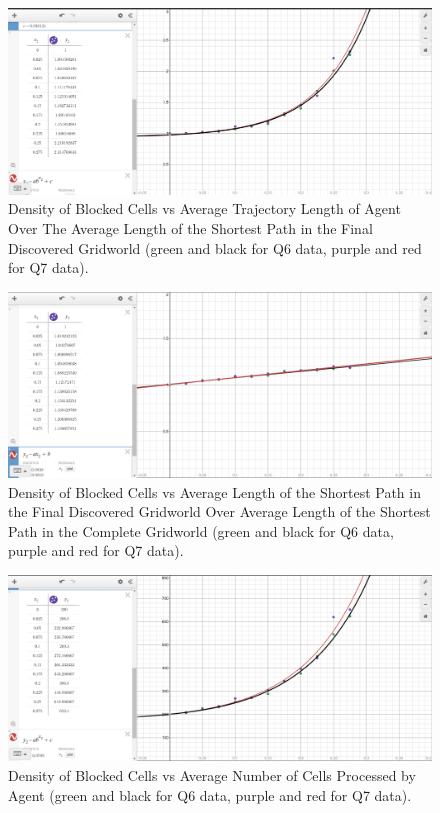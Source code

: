 \documentclass{homeworg}
\begin{document}
\begin{figure}[h]
  	\centering
  	\includegraphics*[scale=0.3]{Q7 Density vs Avg Trajectory Length Over Length in Final Discovered Gridworld.png}
	\caption{Density of Blocked Cells vs Average Trajectory Length of Agent Over The Average Length of the Shortest Path in the Final Discovered Gridworld (green and black for Q6 data, purple and red for Q7 data).}
	\label{fig:example}
\end{figure}

\begin{figure}[h]
  	\centering
  	\includegraphics*[scale=0.3]{Q7 Density vs Avg Length in Final Discovered Gridworld Over Length in Complete Gridworld.png}
	\caption{Density of Blocked Cells vs Average Length of the Shortest Path in the Final Discovered Gridworld Over Average Length of the Shortest Path in the Complete Gridworld (green and black for Q6 data, purple and red for Q7 data).}
	\label{fig:example}
\end{figure}

\begin{figure}[h]
  	\centering
  	\includegraphics*[scale=0.3]{Q7 Density vs Avg Number of Cells Processed.png}
	\caption{Density of Blocked Cells vs Average Number of Cells Processed by Agent (green and black for Q6 data, purple and red for Q7 data).}
	\label{fig:example}
\end{figure}
\end{document}
